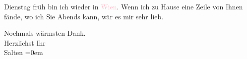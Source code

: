 \pstart
           Dienstag früh bin ich wieder in \textcolor{pink}{Wien}{}\ledrightnote{\textcolor{pink}{Wien}}. Wenn ich zu Hause eine Zeile von Ihnen fände, wo ich Sie
                  Abends{ }{\pb}\label{K_L03291-2v}\label{K_L03291-2h} kann, wär es mir sehr lieb.\pend
           
\pstart
           Nochmals wärmsten Dank. {\\[\baselineskip]}Herzlichst Ihr {\\[\baselineskip]}\spacefill\mbox{Salten}\pend
           \leftskip=0em{}\endnumbering{}  
      